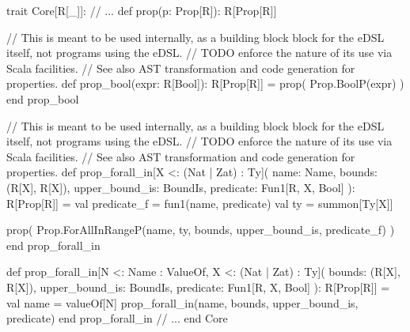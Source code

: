 \documentclass[11pt]{article}
\begin{document}
\begin{ScalaBlockSimple}
trait Core[R[_]]:
  // ...
  def prop(p: Prop[R]): R[Prop[R]]

  // This is meant to be used internally, as a building block block for the eDSL itself, not programs using the eDSL.
  // TODO enforce the nature of its use via Scala facilities.
  // See also AST transformation and code generation for properties.
  def prop_bool(expr: R[Bool]): R[Prop[R]] =
    prop( Prop.BoolP(expr) )
  end prop_bool

  // This is meant to be used internally, as a building block block for the eDSL itself, not programs using the eDSL.
  // TODO enforce the nature of its use via Scala facilities.
  // See also AST transformation and code generation for properties.
  def prop_forall_in[X <: (Nat | Zat) : Ty](
    name: Name,
    bounds: (R[X], R[X]),
    upper_bound_is: BoundIs,
    predicate: Fun1[R, X, Bool]
  ): R[Prop[R]] =
    val predicate_f = fun1(name, predicate)
    val ty = summon[Ty[X]]

    prop( Prop.ForAllInRangeP(name, ty, bounds, upper_bound_is, predicate_f) )
  end prop_forall_in

  def prop_forall_in[N <: Name : ValueOf, X <: (Nat | Zat) : Ty](
    bounds: (R[X], R[X]),
    upper_bound_is: BoundIs,
    predicate: Fun1[R, X, Bool]
  ): R[Prop[R]] =
    val name = valueOf[N]
    prop_forall_in(name, bounds, upper_bound_is, predicate)
  end prop_forall_in
  // ...
end Core
\end{ScalaBlockSimple}
\end{document}
